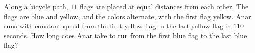 Along a bicycle path, $11$ flags are placed at equal distances from each other. The flags are blue and yellow, and the colors alternate, with the first flag yellow. Anar runs with constant speed from the first yellow flag to the last yellow flag in $110$ seconds. How long does Anar take to run from the first blue flag to the last blue flag?
